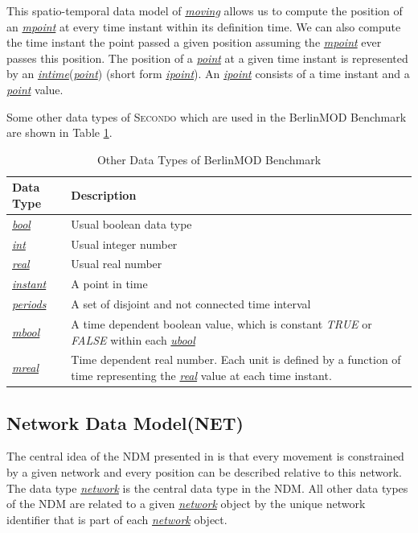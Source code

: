 \documentclass[a4paper]{article}
\newcommand{\secondo}{\textsc{Secondo}}
\newcommand{\bmodb} {BerlinMOD Benchmark}
\newcommand{\dt}[1]{\textsl{\underline{#1}}}
\newcommand{\true}{\textsl{TRUE}}
\newcommand{\false}{\textsl{FALSE}}
\begin{document}
This spatio-temporal data model of \dt{moving} allows us to compute the position
of an \dt{mpoint} at every time instant within its definition time.
We can also compute the time instant the point passed a
given position assuming the \dt{mpoint} ever passes this position. The position of a
\dt{point} at a given time instant is represented by an \dt{intime}(\dt{point})
(short form \dt{ipoint}). An \dt{ipoint} consists of a time instant and a \dt{point} value.

Some other data types of \secondo{} which are used in the \bmodb{} are shown in
Table \ref{tab:bmodbdatatypes}.
\begin{table}[H]
\begin{center}
\begin{scriptsize}
\begin{tabularx}{1.0\textwidth}{|l|X|}
\hline
\textbf{Data Type} & \textbf{Description} \\
\hline
\dt{bool} & Usual boolean data type\\
\hline
\dt{int} & Usual integer number\\
\hline
\dt{real} & Usual real number\\
\hline
\dt{instant} & A point in time\\
\hline
\dt{periods} & A set of disjoint and not connected time interval\\
\hline
\dt{mbool} & A time dependent boolean value, which is constant \true{} or \false{}
within each \dt{ubool} \\
\hline
\dt{mreal} & Time dependent real number. Each unit is defined by a function
of time representing the \dt{real} value at each time instant.\\
\hline
\end{tabularx}
\end{scriptsize}
\caption{Other Data Types of \bmodb{}}
\label{tab:bmodbdatatypes}
\end{center}
\end{table}
\subsection{Network Data Model(NET)}
\label{sec:netdatamod}
The central idea of the NDM presented in \cite{NetworkGueting} is that
every movement is constrained by a given network and every position can be described
relative to this network. The data type \dt{network} is the central
data type in the NDM. All other data types of the NDM
are related to a given \dt{network} object by the unique network identifier that
is part of each \dt{network} object.
\end{document}
